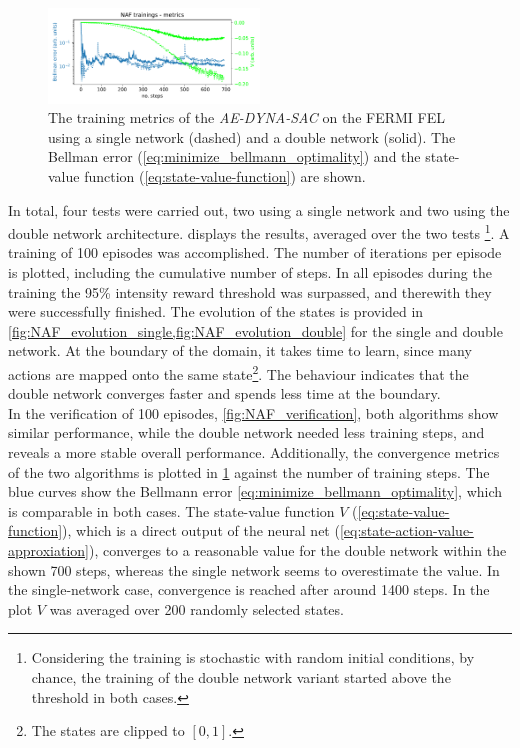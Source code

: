 \documentclass[
reprint,
amsmath,amssymb,amsfonts,clevref,
aps,
prstab,
]{revtex4-2}
\begin{document}
	\begin{figure}
		\centering
		\includegraphics*[width=0.5\textwidth]{Figures/FERMI_all_experiments_NAF_convergence.pdf}
		\caption{The training metrics of the \emph{AE-DYNA-SAC} on the FERMI FEL using a single network (dashed) and a double network (solid). The Bellman error (\cref{eq:minimize_bellmann_optimality}) and the state-value function (\cref{eq:state-value-function}) are shown. }
		\label{fig:NAF_convergence}
	\end{figure}
	In total, four tests were carried out, two using a single network and two using the double network architecture. 
	 displays the results, averaged over the two tests \footnote{Considering the training is stochastic with random initial conditions, by chance, the training of the double network variant started above the threshold in both cases.}. A training of 100 episodes was accomplished. The number of iterations per episode is plotted, including the cumulative number of steps. In all episodes during the training the 95\% intensity reward threshold was surpassed, and therewith they were successfully finished. The evolution of the states is provided in \cref{fig:NAF_evolution_single,fig:NAF_evolution_double} for the single and double network. At the boundary of the domain, it takes time to learn, since many actions are mapped onto the same state\footnote{The states are clipped to $[0,1]$.}. The behaviour indicates that the double network converges faster and spends less time at the boundary.\\
	In the verification of 100 episodes, \cref{fig:NAF_verification}, both algorithms show similar performance, while the double network needed less training steps, and reveals a more stable overall performance. Additionally, the convergence metrics of the two algorithms is plotted in \cref{fig:NAF_convergence} against the number of training steps. The blue curves show the Bellmann error \cref{eq:minimize_bellmann_optimality}, which is comparable in both cases. The state-value function $V$ (\cref{eq:state-value-function}), which is a direct output of the neural net (\cref{eq:state-action-value-approxiation}), converges to a reasonable value for the double network within the shown 700 steps, whereas the single network seems to overestimate the value. In the single-network case, convergence is reached after around 1400 steps. In the plot $V$ was averaged over 200 randomly selected states.
\end{document}

